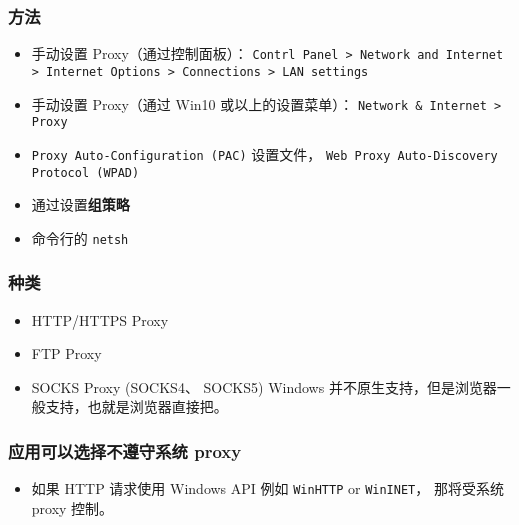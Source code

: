 
\subsubsection{方法}
\begin{itemize}
\item 手动设置 Proxy（通过控制面板）： \verb`Contrl Panel > Network and Internet > Internet Options > Connections > LAN settings`
\item 手动设置 Proxy（通过 Win10 或以上的设置菜单）： \verb`Network & Internet > Proxy`
\item \verb`Proxy Auto-Configuration (PAC)` 设置文件， \verb`Web Proxy Auto-Discovery Protocol (WPAD)`
\item 通过设置\textbf{组策略}
\item 命令行的 \verb`netsh`
\end{itemize}

\subsubsection{种类}
\begin{itemize}
\item HTTP/HTTPS Proxy
\item FTP Proxy
\item SOCKS Proxy (SOCKS4、 SOCKS5) Windows 并不原生支持，但是浏览器一般支持，也就是浏览器直接把。
\end{itemize}

\subsubsection{应用可以选择不遵守系统 proxy}
\begin{itemize}
\item 如果 HTTP 请求使用 Windows API 例如 \verb`WinHTTP` or \verb`WinINET`， 那将受系统 proxy 控制。
\end{itemize}
